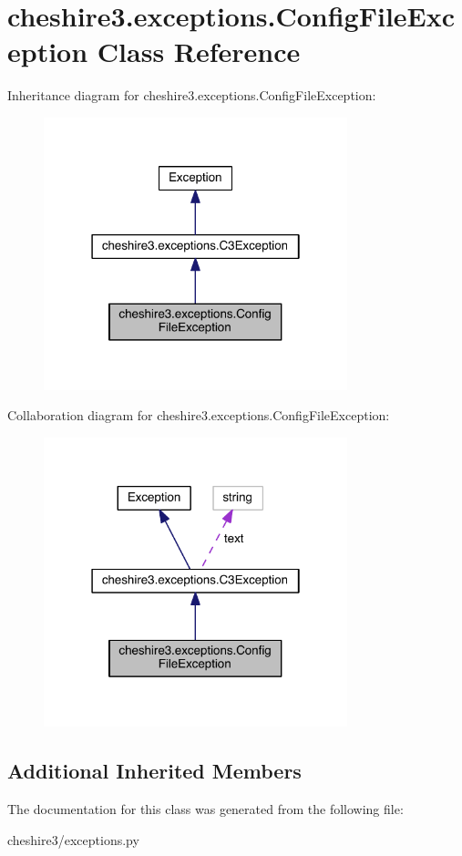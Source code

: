 \hypertarget{classcheshire3_1_1exceptions_1_1_config_file_exception}{\section{cheshire3.\-exceptions.\-Config\-File\-Exception Class Reference}
\label{classcheshire3_1_1exceptions_1_1_config_file_exception}
}


Inheritance diagram for cheshire3.\-exceptions.\-Config\-File\-Exception\-:
\nopagebreak
\begin{figure}[H]
\begin{center}
\leavevmode
\includegraphics[width=250pt]{classcheshire3_1_1exceptions_1_1_config_file_exception__inherit__graph}
\end{center}
\end{figure}


Collaboration diagram for cheshire3.\-exceptions.\-Config\-File\-Exception\-:
\nopagebreak
\begin{figure}[H]
\begin{center}
\leavevmode
\includegraphics[width=250pt]{classcheshire3_1_1exceptions_1_1_config_file_exception__coll__graph}
\end{center}
\end{figure}
\subsection*{Additional Inherited Members}


The documentation for this class was generated from the following file\-:\begin{DoxyCompactItemize}
\item 
cheshire3/exceptions.\-py\end{DoxyCompactItemize}
